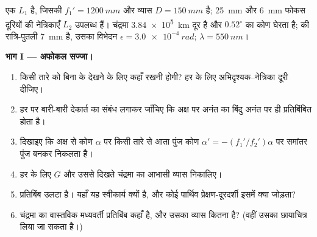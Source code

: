 \begin{problem}
\label{pb:b1:optical-instruments:1}
 एक  $L_1$ है, जिसकी  $f_1' = \qty{1200}{mm}$
और व्यास $D = \qty{150}{mm}$ है; \qty{25}{mm} और \qty{6}{mm} फोकस दूरियों की
नेत्रिकाएँ $L_2$ उपलब्ध हैं। चंद्रमा
\qty{3.84e5}{km} दूर है और $0.52^\circ$ का कोण घेरता है;  की
रात्रि-पुतली \qty{7}{mm} है, उसका विभेदन $\epsilon = \qty{3.0e-4}{rad}$;
$\lambda = \qty{550}{nm}$।

\medskip
\noindent\textbf{भाग I --- अफोकल सज्जा।}
\begin{enumerate}
  \item किसी तारे को बिना  के देखने के लिए  कहाँ रखनी होगी?
        हर  के लिए अभिदृश्यक--नेत्रिका दूरी दीजिए।
  \item हर  पर बारी-बारी देकार्त का संबंध लगाकर जाँचिए कि अक्ष पर अनंत
        का बिंदु अनंत पर ही प्रतिबिंबित होता है।
  \item दिखाइए कि अक्ष से कोण $\alpha$ पर किसी तारे से आता पुंज
        कोण $\alpha' = -(f_1'/f_2')\alpha$ पर समांतर पुंज बनकर निकलता है।
  \item हर  के लिए $G$ और उससे दिखते चंद्रमा का आभासी व्यास
        निकालिए।
  \item प्रतिबिंब उलटा है। यहाँ यह स्वीकार्य क्यों है, और कोई पार्थिव
        प्रेक्षण-दूरदर्शी इसमें क्या जोड़ता?
  \item चंद्रमा का वास्तविक मध्यवर्ती प्रतिबिंब कहाँ है, और उसका व्यास
        कितना है? (वहीं उसका छायाचित्र लिया जा सकता है।)
\end{enumerate}


\end{problem}
